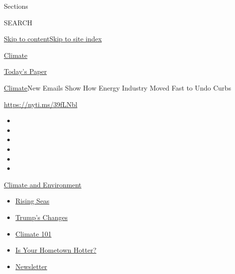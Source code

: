 Sections

SEARCH

\protect\hyperlink{site-content}{Skip to
content}\protect\hyperlink{site-index}{Skip to site index}

\href{https://www.nytimes3xbfgragh.onion/section/climate}{Climate}

\href{https://myaccount.nytimes3xbfgragh.onion/auth/login?response_type=cookie\&client_id=vi}{}

\href{https://www.nytimes3xbfgragh.onion/section/todayspaper}{Today's
Paper}

\href{/section/climate}{Climate}\textbar{}New Emails Show How Energy
Industry Moved Fast to Undo Curbs

\url{https://nyti.ms/39fLNbl}

\begin{itemize}
\item
\item
\item
\item
\item
\item
\end{itemize}

\href{https://www.nytimes3xbfgragh.onion/section/climate?action=click\&pgtype=Article\&state=default\&region=TOP_BANNER\&context=storylines_menu}{Climate
and Environment}

\begin{itemize}
\tightlist
\item
  \href{https://www.nytimes3xbfgragh.onion/2020/07/30/climate/sea-level-inland-floods.html?action=click\&pgtype=Article\&state=default\&region=TOP_BANNER\&context=storylines_menu}{Rising
  Seas}
\item
  \href{https://www.nytimes3xbfgragh.onion/interactive/2020/climate/trump-environment-rollbacks.html?action=click\&pgtype=Article\&state=default\&region=TOP_BANNER\&context=storylines_menu}{Trump's
  Changes}
\item
  \href{https://www.nytimes3xbfgragh.onion/interactive/2020/04/19/climate/climate-crash-course-1.html?action=click\&pgtype=Article\&state=default\&region=TOP_BANNER\&context=storylines_menu}{Climate
  101}
\item
  \href{https://www.nytimes3xbfgragh.onion/interactive/2018/08/30/climate/how-much-hotter-is-your-hometown.html?action=click\&pgtype=Article\&state=default\&region=TOP_BANNER\&context=storylines_menu}{Is
  Your Hometown Hotter?}
\item
  \href{https://www.nytimes3xbfgragh.onion/newsletters/climate-change?action=click\&pgtype=Article\&state=default\&region=TOP_BANNER\&context=storylines_menu}{Newsletter}
\end{itemize}

